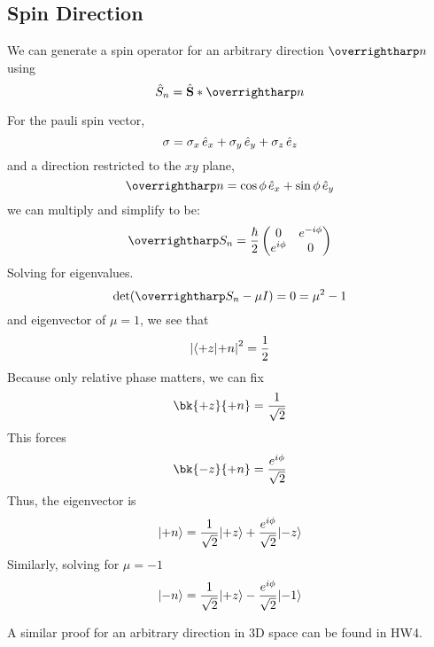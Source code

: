 \subsection{Spin Direction}
We can generate a spin operator for an arbitrary direction \(\vv{n}\) using
\begin{equation}
	\hat S_n = \hat{\vb{S}} * \vv{n}
\end{equation}

For the pauli spin vector,
\[\sigma = \sigma_x \,\hat{e}_{x} + \sigma_y \,\hat{e}_{y} + \sigma_z \,\hat{e}_{z}\]
and a direction restricted to the \(xy\) plane, 
\[\vv{n}=\cos\phi\e x + \sin\phi \e y\]
we can multiply and simplify to be:
\[\vv{S}_n = \frac{\hbar}{2} \begin{pmatrix}
	0 & e^{-i\phi}\\e^{i\phi} & 0
\end{pmatrix}\]
Solving for eigenvalues. 
\[\det(\vv{S}_n-\mu I) = 0 = \mu^2-1\]
and eigenvector of \(\mu=1\), we see that 
\[\left|\langle+z\rvert{+n}\right|^2=\frac{1}{2}\]
Because only relative phase matters, we can fix
\[\bk{+z}{+n}=\frac{1}{\sqrt{2}}\]
This forces
\[\bk{-z}{+n}=\frac{e^{i\phi}}{\sqrt{2}}\]
Thus, the eigenvector is
\[\lvert+n\rangle=\frac{1}{\sqrt{2}}\lvert+z\rangle+\frac{e^{i\phi}}{\sqrt{2}}\lvert-z\rangle\]
Similarly, solving for \(\mu=-1\)
\[\lvert-n\rangle=\frac{1}{\sqrt{2}}\lvert+z\rangle-\frac{e^{i\phi}}{\sqrt{2}}\lvert-1\rangle\]

A similar proof for an arbitrary direction in 3D space can be found in HW4.
